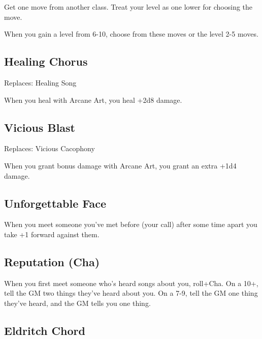 Get one move from another class. Treat your level as one lower for choosing the move.

         
\startInstructions
When you gain a level from 6-10, choose from these moves or the level 2-5 moves.
\stopInstructions
         
\subsection{Healing Chorus}   
         

Replaces: Healing Song

         

When you heal with Arcane Art, you heal +2d8 damage.

         
\subsection{Vicious Blast}    
         

Replaces: Vicious Cacophony

         

When you grant bonus damage with Arcane Art, you grant an extra +1d4 damage.

         
\subsection{Unforgettable Face}    
         

When you meet someone you've met before (your call) after some time apart you take +1 forward against them.

         
\subsection{Reputation (Cha)}    
         

When you first meet someone who's heard songs about you, roll+Cha. On a 10+, tell the GM two things they've heard about you. On a 7-9, tell the GM one thing they've heard, and the GM tells you one thing.

         
\subsection{Eldritch Chord}    
         

